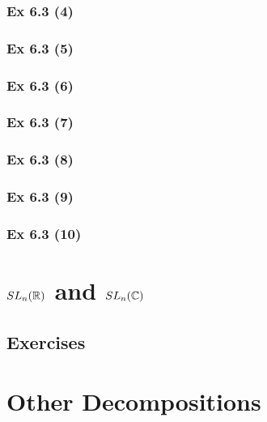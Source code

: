 \subsubsection{Ex 6.3 (4)}\label{sec:Ex_6.3.4}

\subsubsection{Ex 6.3 (5)}\label{sec:Ex_6.3.5}

\subsubsection{Ex 6.3 (6)}\label{sec:Ex_6.3.6}

\subsubsection{Ex 6.3 (7)}\label{sec:Ex_6.3.7}

\subsubsection{Ex 6.3 (8)}\label{sec:Ex_6.3.8}

\subsubsection{Ex 6.3 (9)}\label{sec:Ex_6.3.9}

\subsubsection{Ex 6.3 (10)}\label{sec:Ex_6.3.10}

\newpage		%

\section{$SL_n(\mathbb{R})$ and $SL_n(\mathbb{C})$}\label{sec:6.4}
\subsection{Exercises}\label{sec:6.4_Exercises}

\newpage		%

\section{Other Decompositions}\label{sec:6.5}
